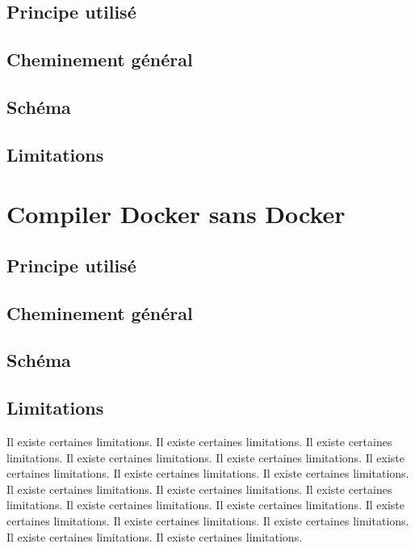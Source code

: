 \documentclass[11pt,a4paper,oneside]{article}
\begin{document}
\subsection{Principe utilisé}

\subsection{Cheminement général}

\subsection{Schéma}

\subsection{Limitations}



\section{Compiler Docker sans Docker}

\subsection{Principe utilisé}

\subsection{Cheminement général}

\subsection{Schéma}

\subsection{Limitations}

Il existe certaines limitations.
Il existe certaines limitations.
Il existe certaines limitations.
Il existe certaines limitations.
Il existe certaines limitations.
Il existe certaines limitations.
Il existe certaines limitations.
Il existe certaines limitations.
Il existe certaines limitations.
Il existe certaines limitations.
Il existe certaines limitations.
Il existe certaines limitations.
Il existe certaines limitations.
Il existe certaines limitations.
Il existe certaines limitations.
Il existe certaines limitations.
Il existe certaines limitations.
Il existe certaines limitations.
\end{document}
